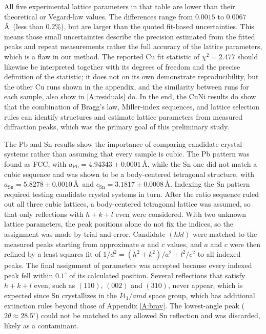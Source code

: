 \documentclass[12pt]{article}
\begin{document}
All five experimental lattice parameters in that table are lower than their theoretical or Vegard-law values. The differences range from $0.0015$ to $0.0067$\,\AA\ (less than $0.2\%$), but are larger
than the quoted fit-based uncertainties. This means those small uncertainties describe the precision estimated from the fitted peaks and repeat measurements rather the full accuracy of the lattice parameters,
which is a flaw in our method. The reported Cu fit statistic of $\chi^2=2.477$ should likewise be interpreted together with its degrees of freedom and the precise definition of the statistic; it does not on its
own demonstrate reproducibility, but the other Cu runs shown in the appendix, and the similarity between runs for each sample, also show in \ref{A:residuals} do. In the end, the CuNi results do show that the
combination of Bragg's law, Miller-index sequences, and lattice selection rules can identify structures and estimate lattice parameters from measured diffraction peaks, which was the primary goal of this preliminary study.

The Pb and Sn results show the importance of comparing candidate crystal systems rather than assuming that every sample is cubic. The Pb pattern was found as FCC, with $a_{\mathrm{Pb}}=4.94343 \pm 0.0001$\,\AA, while the Sn
one did not match a cubic sequence and was shown to be a body-centered tetragonal structure, with $a_{\mathrm{Sn}}=5.8278 \pm 0.0010$\,\AA\ and $c_{\mathrm{Sn}}=3.1817 \pm 0.0008$\,\AA. Indexing the Sn pattern required testing
candidate crystal systems in turn. After the ratio sequence ruled out all three cubic lattices, a body-centered tetragonal lattice was assumed, so that only reflections with $h+k+l$ even were considered. With two unknown lattice parameters,
the peak positions alone do not fix the indices, so the assignment was made by trial and error. Candidate $(hkl)$ were matched to the measured peaks starting from approximate $a$ and $c$ values, and $a$ and $c$ were then refined by a least-squares
fit of $1/d^2=(h^2+k^2)/a^2+l^2/c^2$ to all indexed peaks. The final assignment of parameters was accepted because every indexed peak fell within $0.1^{\circ}$ of its calculated position. Several reflections that satisfy $h+k+l$ even, such as
$(110)$, $(002)$ and $(310)$, never appear, which is expected since Sn crystallizes in the $I4_1/amd$ space group, which has additional extinction rules beyond those of Appendix \ref{A:brav}. The lowest-angle peak ($2\theta\approx28.5^{\circ}$)
could not be matched to any allowed Sn reflection and was discarded, likely as a contaminant.
\end{document}
